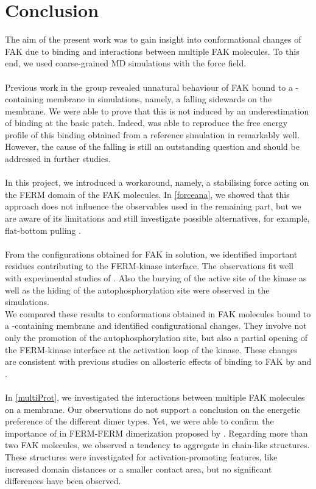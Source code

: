 \chapter{Conclusion}
The aim of the present work was to gain insight into conformational changes of FAK due to \pip{} binding and interactions between multiple FAK molecules. To this end, we used coarse-grained MD simulations with the \martini{} force field.\\
\\
Previous work in the group revealed unnatural behaviour of FAK bound to a \pip{}-containing membrane in \martini{} simulations, namely, a falling sidewards on the membrane. We were able to prove that this is not induced by an underestimation of \pip{} binding at the basic patch. Indeed, \martini{} was able to reproduce the free energy profile of this binding obtained from a reference simulation in \charmm{} remarkably well. However, the cause of the falling is still an outstanding question and should be addressed in further studies.\\ %
\\
In this project, we introduced a workaround, namely, a stabilising force acting on the FERM domain of the FAK molecules. In \autoref{forceana}, we showed that this approach does not influence the observables used in the remaining part, but we are aware of its limitations and still investigate possible alternatives, for example, flat-bottom pulling \autocite[p. 156-158]{gromacsManual}.\\
\\
From the configurations obtained for FAK in solution, we identified important residues contributing to the FERM-kinase interface. The observations fit well with experimental studies of \textcite{structFAK}. Also the burying of the active site of the kinase as well as the hiding of the autophosphorylation site were observed in the simulations.\\
We compared these results to conformations obtained in FAK molecules bound to a \pip{}-containing membrane and identified configurational changes. They involve not only the promotion of the autophosphorylation site, but also a partial opening of the FERM-kinase interface at the activation loop of the kinase. These changes are consistent with previous studies on allosteric effects of \pip{} binding to FAK by \textcite{pap001} and \textcite{pap003}.\\
\\
In \autoref{multiProt}, we investigated the interactions between multiple FAK molecules on a membrane. Our observations do not support a conclusion on the energetic preference of the different dimer types. Yet, we were able to confirm the importance of  in FERM-FERM dimerization proposed by \textcite{fakdimers}. Regarding more than two FAK molecules, we observed a tendency to aggregate in chain-like structures. These structures were investigated for activation-promoting features, like increased domain distances or a smaller contact area, but no significant differences have been observed.\\

